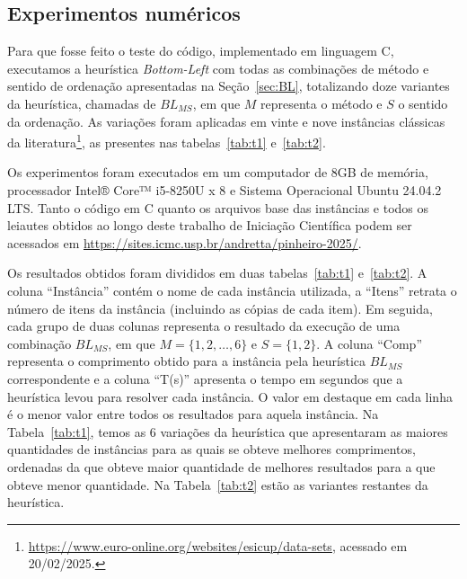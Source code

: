 \subsection{Experimentos numéricos} \label{sec:experimentosbl}


Para que fosse feito o teste do código, implementado em linguagem C, executamos a heurística \textit{Bottom-Left} com todas as combinações de método e sentido de ordenação apresentadas na Seção~\ref{sec:BL}, totalizando doze variantes da heurística, chamadas de $BL_{MS}$, em que $M$ representa o método e $S$ o sentido da ordenação. 
As variações foram aplicadas em vinte e nove instâncias clássicas da literatura\footnote{\url{https://www.euro-online.org/websites/esicup/data-sets}, acessado em 20/02/2025.}, as presentes nas tabelas~\ref{tab:t1} e~\ref{tab:t2}.

Os experimentos foram executados em um computador de 8GB de memória, processador Intel® Core™ i5-8250U x 8 e Sistema Operacional Ubuntu 24.04.2 LTS. 
Tanto o código em C quanto os arquivos base das instâncias e todos os leiautes obtidos ao longo deste trabalho de Iniciação Científica podem ser acessados em \url{https://sites.icmc.usp.br/andretta/pinheiro-2025/}.


Os resultados obtidos foram divididos em duas tabelas~\ref{tab:t1} e~\ref{tab:t2}. A coluna ``Instância'' contém o nome de cada instância utilizada, a ``Itens'' retrata o número de itens da instância (incluindo as cópias de cada item). 
Em seguida, cada grupo de duas colunas representa o resultado da execução de uma combinação $BL_{MS}$, em que $M = \{1, 2, \dots, 6\}$ e $S = \{1, 2\}$. 
A coluna ``Comp'' representa o comprimento obtido para a instância pela heurística $BL_{MS}$ correspondente e a coluna ``T(s)'' apresenta o tempo em segundos que a heurística levou para resolver cada instância. 
O valor em destaque em cada linha é o menor valor entre todos os resultados para aquela instância. 
Na Tabela~\ref{tab:t1}, temos as 6 variações da heurística que apresentaram as maiores quantidades de instâncias para as quais se obteve melhores comprimentos, ordenadas da que obteve maior quantidade de melhores resultados para a que obteve menor quantidade. 
Na Tabela~\ref{tab:t2} estão as variantes restantes da heurística.

